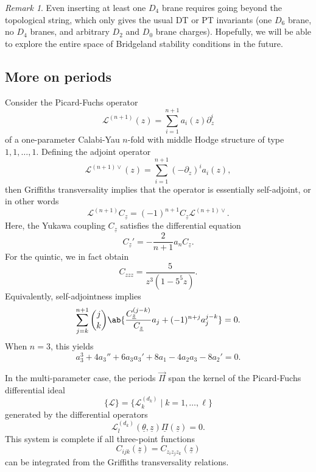 \documentclass[10pt]{amsart}
\theoremstyle{definition}
\theoremstyle{remark}
\newtheorem{rmk}[thm]{Remark}
\theoremstyle{plain}
\theoremstyle{definition}
\theoremstyle{remark}
\newcommand{\mc}[1]{\mathcal{#1}}
\newcommand{\uz}{\ul{z}}
\newcommand{\ul}[1]{\underline{#1}}
\newcommand{\1}{\mathbf{1}}
\newcommand{\2}{\mathbf{2}}
\newcommand{\3}{\mathbf{3}}
\begin{document}
\begin{rmk}
    Even inserting at least one $D_4$ brane requires going beyond the topological string, which only gives the usual DT or PT invariants (one $D_6$ brane, no $D_4$ branes, and arbitrary $D_2$ and $D_0$ brane charges). Hopefully, we will be able to explore the entire space of Bridgeland stability conditions in the future.
\end{rmk}

\subsection{More on periods}%
\label{sub:More on periods}

Consider the Picard-Fuchs operator
\[ \mc{L}^{(n+1)}(z) = \sum_{i=1}^{n+1} a_i(z) \partial_z^i \]
of a one-parameter Calabi-Yau $n$-fold with middle Hodge structure of type $1,1,\ldots, 1$. Defining the adjoint operator
\[ \mc{L}^{(n+1)\vee}(z) = \sum_{i=1}^{n+1}(-\partial_z)^i a_i(z), \]
then Griffiths transversality implies that the operator is essentially self-adjoint, or in other words
\[ \mc{L}^{(n+1)} C_{\uz} = (-1)^{n+1} C_{\uz} \mc{L}^{(n+1)\vee}. \]
Here, the Yukawa coupling $C_{\uz}$ satisfies the differential equation
\[ C_{\uz}' = -\frac{2}{n+1} a_n C_{\uz}. \]
For the quintic, we in fact obtain
\[ C_{zzz}= \frac{5}{z^3(1-5^5z)}. \]
Equivalently, self-adjointness implies
\[ \sum_{j=k}^{n+1} \binom{j}{k} \ab\{ \frac{C_{\uz}^{(j-k)}}{C_{\uz}} a_j + (-1)^{n+j}a_j^{j-k}\} = 0. \]
When $n=3$, this yields
\[ a_3^3 + 4a_3'' + 6a_3 a_3' + 8 a_1 - 4 a_2a_3 - 8 a_2' = 0. \]

In the multi-parameter case, the periods $\vec{\Pi}$ span the kernel of the Picard-Fuchs differential ideal
\[ \{ \mc{L}\} = \{ \mc{L}_k^{(d_k)} \mid k = 1,\ldots,\ell\} \]
generated by the differential operators
\[ \mc{L}_l^{(d_k)}(\ul{\theta}, \uz) \ul{\Pi}(\uz) = 0. \]
This system is complete if all three-point functions
\[ C_{ijk}(\uz) = C_{z_iz_jz_k}(\uz) \]
can be integrated from the Griffiths transversality relations.
\end{document}
